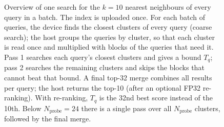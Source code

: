 \begin{figure}[htbp]
{}
\caption{Overview of one search for the \(k=10\) nearest neighbours of every
query in a batch. The index is uploaded once. For each batch
of queries, the device finds the closest clusters of every query (coarse
search); the host groups the queries by cluster, so that each cluster is read
once and multiplied with blocks of the queries that need it. Pass 1 searches
each query's closest clusters and gives a bound \(T_q\); pass 2 searches the
remaining clusters and skips the blocks that cannot beat that bound. A final
top-32 merge combines all results per query; the host returns the top-10
(after an optional FP32 re-ranking). With re-ranking, \(T_q\) is the 32nd best
score instead of the 10th. Below \(N_{\mathrm{probe}}=24\) there is a single pass
over all \(N_{\mathrm{probe}}\) clusters, followed by the final merge.}
\label{fig:gf-overview}
\end{figure}
